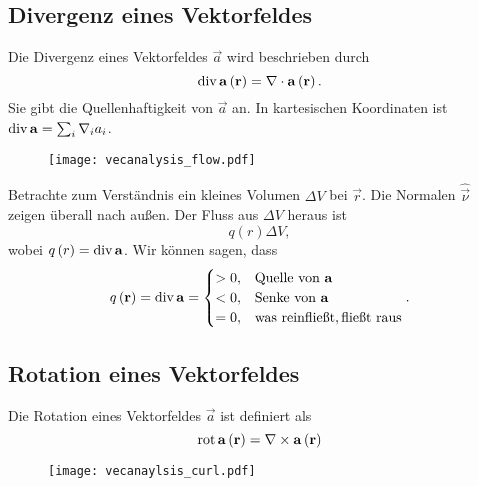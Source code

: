 \subsection{Divergenz eines Vektorfeldes\label{ref-007}}

Die Divergenz eines Vektorfeldes $\vec {a}$ wird beschrieben durch
\begin{equation*}
	\operatorname{div} \mathbf{a}\left(\mathbf{r}\right)=\nabla \cdot \mathbf{a}\left(\mathbf{r}\right).
\end{equation*}
Sie gibt die Quellenhaftigkeit von $\vec {a}$ an. In kartesischen Koordinaten ist $\operatorname{div} \mathbf{a}=\sum _{i}\nabla _{i}a_{i}$.



\begin{figure}[htb]
	\centering
	\texttt{[image: vecanalysis\_flow.pdf]}
	\caption{}
	\label{fig:vecanalysis_flow}
\end{figure}

Betrachte zum Verständnis ein kleines Volumen $\Delta  V$ bei $\vec {r}$. Die Normalen $\hat{\vec {\nu }}$ zeigen überall nach außen. Der Fluss aus $\Delta  V$ heraus ist
\begin{equation*}
	q\left(r\right)\Delta  V,
\end{equation*}
wobei $q\left(r\right)=\operatorname{div} \mathbf{a}$. Wir können sagen, dass
\begin{align*}
	q\left(\mathbf{r}\right)=\operatorname{div} \mathbf{a}=\begin{cases} >0, & \text{Quelle von }\mathbf{a}                     \\
              <0, & \text{Senke von }\mathbf{a}                      \\
              =0, & \text{was reinflie\ss t},\text{flie\ss t raus}
	                                      \end{cases} .
\end{align*}
\subsection{Rotation eines Vektorfeldes\label{ref-008}}

Die Rotation eines Vektorfeldes $\vec {a}$ ist definiert als
\begin{equation*}
	\operatorname{rot} \mathbf{a}\left(\mathbf{r}\right)=\nabla \times \mathbf{a}\left(\mathbf{r}\right)
\end{equation*}


\begin{figure}[htb]
	\centering
	\texttt{[image: vecanaylsis\_curl.pdf]}
	\caption{}
	\label{fig:vecanaylsis_curl}
\end{figure}

